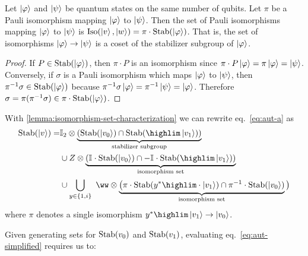 \def\Pauli{\textnormal{\textsc{Pauli}}}
\begin{lemma}
    \label{lemma:isomorphism-set-characterization}
    Let $\ket{\varphi}$ and $\ket{\psi}$ be quantum states on the same number of qubits.
    Let $\pi$ be a Pauli isomorphism mapping $\ket{\varphi}$ to $\ket{\psi}$.
    Then the set of Pauli isomorphisms mapping $\ket{\varphi}$ to $\ket{\psi}$ is
    $\text{Iso}(\ket{v},\ket{w})=\pi \cdot \text{Stab}(\ket{\varphi})$.
    That is, the set of isomorphisms $\ket{\varphi} \rightarrow \ket{\psi}$ is a coset of the stabilizer subgroup of $\ket{\varphi}$.
\end{lemma}
\begin{proof}
    If $P\in \text{Stab}(\ket{\varphi})$, then $\pi \cdot P$ is an isomorphism since $\pi \cdot P \ket{\varphi} = \pi \ket{\varphi} = \ket{\psi}$.
    Conversely, if $\sigma$ is a Pauli isomorphism which maps $\ket{\varphi}$ to $\ket{\psi}$, then $ \pi^{-1} \sigma \in \text{Stab}(\ket{\varphi})$ because $\pi^{-1} \sigma \ket{\varphi} = \pi^{-1} \ket{\psi} = \ket{\varphi}$.
    Therefore $\sigma=\pi(\pi^{-1}\sigma)\in \pi \cdot \text{Stab}(\ket{\varphi})$.
\end{proof}
With \autoref{lemma:isomorphism-set-characterization} we can rewrite eq.~\eqref{eq:aut-a} as
\begin{align}     
    \nonumber
    \Aut(\ket{v}) =& %
          \id[2] \otimes \underbrace{( \Aut(\ket{v_0}) \cap \Aut(\highlim\ket{v_1}) )}_{\textnormal{stabilizer subgroup}} \\
          & \cup Z \otimes \underbrace{( \id \cdot \Aut(\ket{v_0}) \cap -\id \cdot \Aut(\highlim\ket{v_1}) )}_{\textnormal{isomorphism set}} 
          \nonumber
          \\
          &\cup 
          \bigcup_{y \in\set{1, i}}
          \
    \ww \otimes  \underbrace{
        \big(
        \pi
        \cdot
        \Aut(y^* \highlim \cdot \ket{v_1})
        \cap
        \pi^{-1}
        \cdot
        \Aut(\ket{v_0})}_{\textnormal{isomorphism set}}
        \big)
    \label{eq:aut-simplified}
\end{align}
where $\pi$ denotes a single isomorphism $y^* \highlim\ket{v_1}  \rightarrow \ket{v_0}$.


Given generating sets for $\text{Stab}(v_0)$ and $\text{Stab}(v_1)$, evaluating eq.~\eqref{eq:aut-simplified} requires us to:

